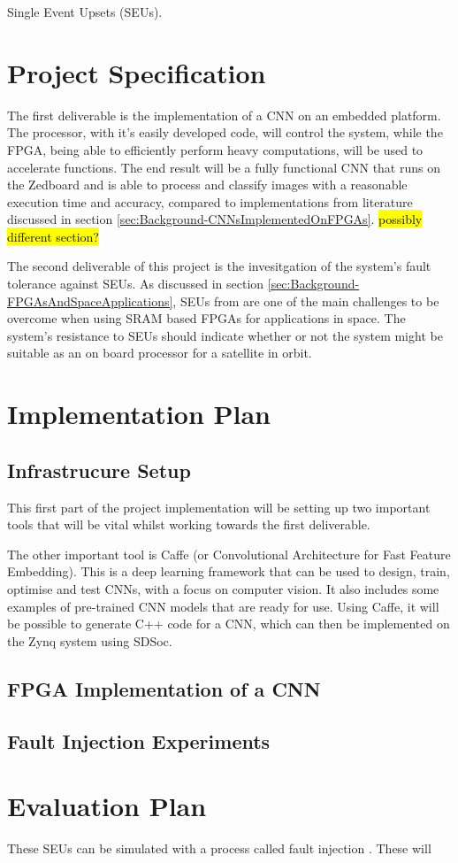 \documentclass[12pt]{article}
\begin{document}
Single Event Upsets (SEUs).

\section{Project Specification}
\label{sec:ProjSpec}

The first deliverable is the implementation of a CNN on an embedded platform.  The processor, with it's easily developed code, will control the system, while the FPGA, being able to efficiently perform heavy computations, will be used to accelerate functions. The end result will be a fully functional CNN that runs on the Zedboard and is able to process and classify images with a reasonable execution time and accuracy, compared to implementations from literature discussed in section \ref{sec:Background-CNNsImplementedOnFPGAs}. \hl{possibly different section?}

The second deliverable of this project is the invesitgation of the system's fault tolerance against SEUs. As discussed in section \ref{sec:Background-FPGAsAndSpaceApplications}, SEUs from are one of the main challenges to be overcome when using SRAM based FPGAs for applications in space. The system's resistance to SEUs should indicate whether or not the system might be suitable as an on board processor for a satellite in orbit.

\section{Implementation Plan}
\label{sec:ImpPlan}

\subsection{Infrastrucure Setup}
\label{sec:ImpPlan-InfSetup}

This first part of the project implementation will be setting up two important tools that will be vital whilst working towards the first deliverable.

The other important tool is Caffe (or Convolutional Architecture for Fast Feature Embedding). This is a deep learning framework that can be used to design, train, optimise and test CNNs, with a focus on computer vision\cite{jia2014caffe}. It also includes some examples of pre-trained CNN models that are ready for use. Using Caffe, it will be possible to generate C++ code for a CNN, which can then be implemented on the Zynq system using SDSoc.

\subsection{FPGA Implementation of a CNN}
\label{sec:ImpPlan-FPGAImplOfCnn}



\subsection{Fault Injection Experiments}
\label{sec:ImpPlan-FaultInjExp}

\section{Evaluation Plan}
\label{sec:EvalPlan}

These SEUs can be simulated with a process called fault injection \cite{FaultInjection}. These will 



\nocite{*}
\end{document}
